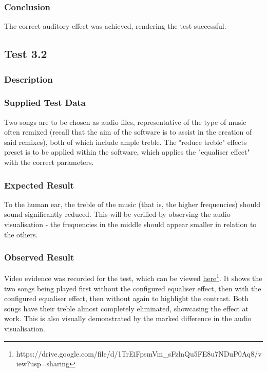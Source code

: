 \subsubsection*{Conclusion}
The correct auditory effect was achieved, rendering the test successful.


\pagebreak
\subsection{Test 3.2}
\subsubsection*{Description}
\paragraph{}
{
	\centering
}

\subsubsection*{Supplied Test Data}
Two songs are to be chosen as audio files, representative of the type of music often remixed (recall that the aim of the software is to assist in the creation of said remixes), both of which include ample treble. The "reduce treble" effects preset is to be applied within the software, which applies the "equaliser effect" with the correct parameters.

\subsubsection*{Expected Result}
To the human ear, the treble of the music (that is, the higher frequencies) should sound significantly reduced. This will be verified by observing the audio visualisation - the frequencies in the middle should appear smaller in relation to the others.

\subsubsection*{Observed Result}
\label{sec:evidence3.2}
Video evidence was recorded for the test, which can be viewed \href{https://drive.google.com/file/d/1TrEiFpsmVm_sFzlnQu5FE8u7NDuP0Aq8/view?usp=sharing}{here}\footnote{
	https://drive.google.com/file/d/1TrEiFpsmVm\_sFzlnQu5FE8u7NDuP0Aq8/view?usp=sharing
}. It shows the two songs being played first without the configured equaliser effect, then with the configured equaliser effect, then without again to highlight the contrast. Both songs have their treble almost completely eliminated, showcasing the effect at work. This is also visually demonstrated by the marked difference in the audio visualisation.

